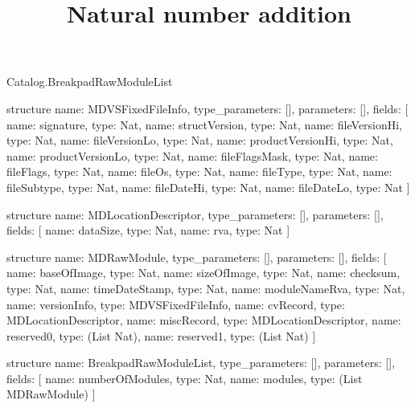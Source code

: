 \begin{lexlean}{Catalog.BreakpadRawModuleList}
\title{Natural number addition}
\begin{semanticmodule}
structure{
  name: MDVSFixedFileInfo,
  type_parameters: [],
  parameters: [],
  fields: [
    {name: signature, type: Nat},
    {name: structVersion, type: Nat},
    {name: fileVersionHi, type: Nat},
    {name: fileVersionLo, type: Nat},
    {name: productVersionHi, type: Nat},
    {name: productVersionLo, type: Nat},
    {name: fileFlagsMask, type: Nat},
    {name: fileFlags, type: Nat},
    {name: fileOs, type: Nat},
    {name: fileType, type: Nat},
    {name: fileSubtype, type: Nat},
    {name: fileDateHi, type: Nat},
    {name: fileDateLo, type: Nat}
  ]
}

structure{
  name: MDLocationDescriptor,
  type_parameters: [],
  parameters: [],
  fields: [
    {name: dataSize, type: Nat},
    {name: rva, type: Nat}
  ]
}

structure{
  name: MDRawModule,
  type_parameters: [],
  parameters: [],
  fields: [
    {name: baseOfImage, type: Nat},
    {name: sizeOfImage, type: Nat},
    {name: checksum, type: Nat},
    {name: timeDateStamp, type: Nat},
    {name: moduleNameRva, type: Nat},
    {name: versionInfo, type: MDVSFixedFileInfo},
    {name: cvRecord, type: MDLocationDescriptor},
    {name: miscRecord, type: MDLocationDescriptor},
    {name: reserved0, type: (List Nat)},
    {name: reserved1, type: (List Nat)}
  ]
}

structure{
  name: BreakpadRawModuleList,
  type_parameters: [],
  parameters: [],
  fields: [
    {name: numberOfModules, type: Nat},
    {name: modules, type: (List MDRawModule)}
  ]
}
\end{semanticmodule}
\end{lexlean}
